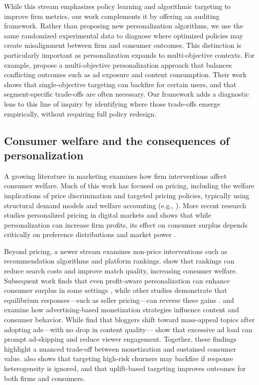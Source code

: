 \documentclass[11pt,letterpaper,english]{article}
\theoremstyle{definition}
\theoremstyle{definition}
\begin{document}
\begin{bibunit}
While this stream emphasizes policy learning and algorithmic targeting to improve firm metrics, our work complements it by offering an auditing framework. Rather than proposing new personalization algorithms, we use the same randomized experimental data to diagnose where optimized policies may create misalignment between firm and consumer outcomes. This distinction is particularly important as personalization expands to multi-objective contexts. For example, \citet{rafieian2025multiobjective} propose a multi-objective personalization approach that balances conflicting outcomes such as ad exposure and content consumption. Their work shows that single-objective targeting can backfire for certain users, and that segment-specific trade-offs are often necessary. Our framework adds a diagnostic lens to this line of inquiry by identifying where those trade-offs emerge empirically, without requiring full policy redesign.

\subsection{Consumer welfare and the consequences of personalization}
A growing literature in marketing examines how firm interventions affect consumer welfare. Much of this work has focused on pricing, including the welfare implications of price discrimination and targeted pricing policies, typically using structural demand models and welfare accounting (e.g., \citealp{petrin2002quantifying, leslie2004price, chintagunta2003balancing}). More recent research studies personalized pricing in digital markets and shows that while personalization can increase firm profits, its effect on consumer surplus depends critically on preference distributions and market power \citep{dube2023personalized}.

Beyond pricing, a newer stream examines non-price interventions such as recommendation algorithms and platform rankings. \citet{ursu2018power} show that rankings can reduce search costs and improve match quality, increasing consumer welfare. Subsequent work finds that even profit-aware personalization can enhance consumer surplus in some settings \citep{donnelly2024welfare}, while other studies demonstrate that equilibrium responses—such as seller pricing—can reverse these gains \citep{zhou2023competing, kaye2024personalization}. \citet{sun2013ad} and \citet{tuchman2018television} examine how advertising-based monetization strategies influence content and consumer behavior. While \citet{sun2013ad} find that bloggers shift toward mass-appeal topics after adopting ads—with no drop in content quality—\citet{tuchman2018television} show that excessive ad load can prompt ad-skipping and reduce viewer engagement. Together, these findings highlight a nuanced trade-off between monetization and sustained consumer value. \citet{ascarza2018retention} also shows that targeting high-risk churners may backfire if response heterogeneity is ignored, and that uplift-based targeting improves outcomes for both firms and consumers.


\end{bibunit}
\end{document}
